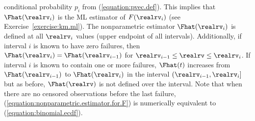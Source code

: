conditional probability $p_{i}$ from (\ref{equation:pvec.def}).  This
implies that $\Fhat(\realrv_{i})$ is the ML estimator of
$F(\realrv_{i})$ (see Exercise~\ref{exercise:km.ml}).  The
nonparametric estimator $\Fhat(\realrv_{i})$ is defined at all
$\realrv_{i}$ values (upper endpoint of all intervals).  Additionally,
if interval $i$ is known to have zero failures, then
$\Fhat(\realrv_{i})=\Fhat(\realrv_{i-1})$ for $\realrv_{i-1}\leq
\realrv \leq
\realrv_{i}$. If interval $i$ is known to contain one or more
failures, $\Fhat(t)$ increases from $\Fhat(\realrv_{i-1})$ to
$\Fhat(\realrv_{i})$ in the interval $(\realrv_{i-1},\realrv_{i}]$ but
as before, $\Fhat(\realrv)$ is not defined over the interval.
Note that when there are no censored observations before
the last failure, (\ref{equation:nonparametric.estimator.for.F}) is
numerically equivalent to (\ref{equation:binomial.ecdf}).

